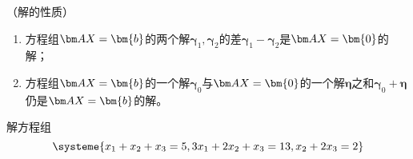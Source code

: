 \begin{theorem}
    （解的性质）
    \begin{enumerate}[(1)]
        \item 方程组$\mat{AX}=\bm{b}$的两个解$\bm{\gamma}_1,\bm{\gamma}_2$的差$\bm{\gamma}_1 - \bm{\gamma}_2$是$\mat{AX}=\bm{0}$的解；
        \item 方程组$\mat{AX}=\bm{b}$的一个解$\bm{\gamma}_0$与$\mat{AX}=\bm{0}$的一个解$\bm{\eta}$之和$\bm{\gamma}_0+\bm{\eta}$仍是$\mat{AX}=\bm{b}$的解。
    \end{enumerate}
\end{theorem}

\begin{example}
    解方程组
    \[
        \systeme{
            x_1 +  x_2 +  x_3 = 5,
            3x_1 + 2x_2 +  x_3 = 13,
            x_2 + 2x_3 =2
        }
    \]
\end{example}
